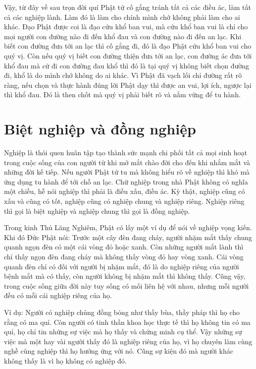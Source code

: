 \documentclass[
  12pt,
  oneside]{book}
\begin{document}
Vậy, từ đây về sau trọn đời quí Phật tử cố gắng tránh tất cả các điều ác, làm tất cả các nghiệp lành. Làm đó là làm cho chính mình chớ không phải làm cho ai khác. Đạo Phật được coi là đạo cứu khổ ban vui, mà cứu khổ ban vui là chỉ cho mọi người con đường nào đi đến khổ đau và con đường nào đi đến an lạc. Khi biết con đường đưa tới an lạc thì cố gắng đi, đó là đạo Phật cứu khổ ban vui cho quý vị. Còn nếu quý vị biết con đường thiện đưa tới an lạc, con đường ác đưa tới khổ đau mà cứ đi con đường đau khổ thì đó là tại quý vị không biết chọn đường đi, khổ là do mình chớ không do ai khác. Vì Phật đã vạch lối chỉ đường rất rõ ràng, nếu chọn và thực hành đúng lời Phật dạy thì được an vui, lợi ích, ngược lại thì khổ đau. Đó là then chốt mà quý vị phải biết rõ và nắm vững để tu hành.

\hypertarget{biet-nghiep-va-dong-nghiep}{%
\chapter*{Biệt nghiệp và đồng nghiệp}\label{biet-nghiep-va-dong-nghiep}}

Nghiệp là thói quen huân tập tạo thành sức mạnh chi phối tất cả mọi sinh hoạt trong cuộc sống của con người từ khi mở mắt chào đời cho đến khi nhắm mắt và những đời kế tiếp. Nếu người Phật tử tu mà không hiểu rõ về nghiệp thì khó mà ứng dụng tu hành để tới chỗ an lạc. Chữ nghiệp trong nhà Phật không có nghĩa một chiều, hễ nói nghiệp thì phải là điều xấu, điều ác. Kỳ thật, nghiệp cũng có xấu và cũng có tốt, nghiệp cũng có nghiệp chung và nghiệp riêng. Nghiệp riêng thì gọi là biệt nghiệp và nghiệp chung thì gọi là đồng nghiệp.

Trong kinh Thủ Lăng Nghiêm, Phật có lấy một ví dụ để nói về nghiệp vọng kiến. Khi đó Đức Phật nói: Trước một cây đèn đang cháy, người nhặm mắt thấy chung quanh ngọn đèn có một cái vòng đỏ hoặc xanh. Còn những người mắt lành thì chỉ thấy ngọn đèn đang cháy mà không thấy vòng đỏ hay vòng xanh. Cái vòng quanh đèn chỉ có đối với người bị nhặm mắt, đó là do nghiệp riêng của người bệnh mắt mà có thấy, còn người không bị nhặm mắt thì không thấy. Cũng vậy, trong cuộc sống giữa đời này tuy sống có mối liên hệ với nhau, nhưng mỗi người đều có mỗi cái nghiệp riêng của họ.

Ví dụ: Người có nghiệp chủng đồng bóng như thầy bùa, thầy pháp thì họ cho rằng có ma quỉ. Còn người có tinh thần khoa học thực tế thì họ không tin có ma quỉ, họ chỉ tin những sự việc mà họ thấy và chứng minh cụ thể. Vậy những sự việc mà một hay vài người thấy đó là nghiệp riêng của họ, vì họ chuyên làm cùng nghề cùng nghiệp thì họ hưởng ứng với nó. Cũng sự kiện đó mà người khác không thấy là vì họ không có nghiệp đó.
\end{document}
